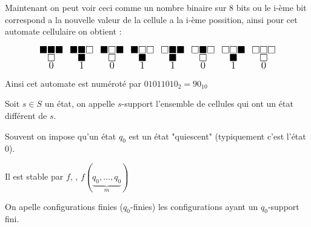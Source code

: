 \begin{notation}
    Maintenant on peut voir ceci comme un nombre binaire sur 8 bits ou le i-ème bit correspond a la 
    nouvelle valeur de la cellule a la i-ème possition, ainsi pour cet automate cellulaire on obtient :
    

	\[ \LARGE
		\substack{\blacksquare \blacksquare \blacksquare \\ \square \\ 0 } \enspace
		\substack{\blacksquare \blacksquare \square \\ \blacksquare \\ 1} \enspace
		\substack{\blacksquare \square \blacksquare \\ \square \\ 0} \enspace
		\substack{\blacksquare \square \square \\ \blacksquare \\ 1} \enspace
		\substack{\square \blacksquare \blacksquare \\ \blacksquare \\ 1} \enspace
		\substack{\square \blacksquare \square \\ \square \\ 0} \enspace
		\substack{\square \square \blacksquare \\ \blacksquare \\ 1} \enspace
		\substack{\square \square \square \\ \square \\ 0}
	\]

    Ainsi cet automate est numéroté par $01011010_2 = 90_{10}$
\end{notation}

\begin{definition}
	Soit $s \in S$ un état, on appelle $s$-support l'ensemble de cellules qui ont
	un état différent de $s$.
\end{definition}

\begin{notation}
	Souvent on impose qu'un état $q_0$ est un état "quiescent" (typiquement c'est l'état 0).

	Il est stable par $f$, \ie, $f(\underbrace{q_0,\ldots, q_0}_m)$
\end{notation}

\begin{definition}
	On apelle configurations finies ($q_0$-finies) les configurations ayant un $q_0$-support fini.
\end{definition}

